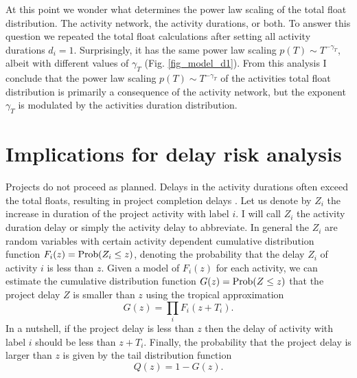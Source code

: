 \documentclass[11pt]{article}
\begin{document}
At this point we wonder what determines the power law scaling  of the total float distribution. The activity network, the activity durations, or both. To answer this question we repeated the total float calculations after setting all activity durations $d_i=1$. Surprisingly, it has the same power law scaling $p(T)\sim T^{-\gamma_T}$, albeit with different values of $\gamma_T$ (Fig. \ref{fig_model_d1}). From this analysis I conclude that the power law scaling $p(T)\sim T^{-\gamma_T}$ of the activities total float distribution is primarily a consequence of the activity network, but the exponent $\gamma_T$ is modulated by the activities duration distribution.

\section{Implications for delay risk analysis}

Projects do not proceed as planned. Delays in the activity durations often exceed the total floats, resulting in project completion delays \cite{ellinas19, park21}. Let us denote by $Z_i$ the increase in duration of the project activity with label $i$. I will call $Z_i$ the activity duration delay or simply the activity delay to abbreviate. In general the $Z_i$ are random variables with certain activity dependent cumulative distribution function $F_i(z) = {\rm Prob}(Z_i\leq z)$, denoting the probability
that the delay $Z_i$ of activity $i$ is less than $z$. Given a model of $F_i(z)$ for each activity,  we can estimate the cumulative distribution function $G(z) = {\rm Prob}(Z\leq z)$ that the project delay $Z$ is smaller than $z$ using the tropical approximation \cite{vazquez_tropical22}
%
\begin{equation}
G(z) = \prod_i  F_i(z + T_i).
\label{GFi}
\end{equation}
%
In a nutshell, if the project delay is less than $z$ then the delay of activity with label $i$ should be less than $z+T_i$.
Finally, the probability that the project delay is larger than $z$ is given by the tail distribution function
%
\begin{equation}
Q(z) = 1 - G(z).
\label{QG}
\end{equation} 
\end{document}

